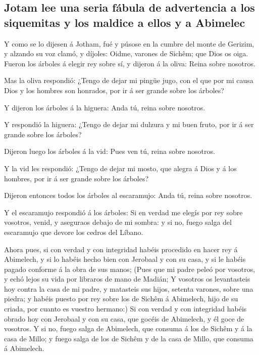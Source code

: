\hypertarget{jotam-lee-una-seria-fuxe1bula-de-advertencia-a-los-siquemitas-y-los-maldice-a-ellos-y-a-abimelec}{%
\subsection{Jotam lee una seria fábula de advertencia a los siquemitas y
los maldice a ellos y a
Abimelec}\label{jotam-lee-una-seria-fuxe1bula-de-advertencia-a-los-siquemitas-y-los-maldice-a-ellos-y-a-abimelec}}

 Y como se lo dijesen á Jotham, fué y púsose en la cumbre
del monte de Gerizim, y alzando su voz clamó, y díjoles: Oidme, varones
de Sichêm; que Dios os oiga.  Fueron los árboles á elegir
rey sobre sí, y dijeron á la oliva: Reina sobre nosotros.

 Mas la oliva respondió: ¿Tengo de dejar mi pingüe jugo, con
el que por mi causa Dios y los hombres son honrados, por ir á ser grande
sobre los árboles?

 Y dijeron los árboles á la higuera: Anda tú, reina sobre
nosotros.

 Y respondió la higuera: ¿Tengo de dejar mi dulzura y mi
buen fruto, por ir á ser grande sobre los árboles?

 Dijeron luego los árboles á la vid: Pues ven tú, reina
sobre nosotros.

 Y la vid les respondió: ¿Tengo de dejar mi mosto, que
alegra á Dios y á los hombres, por ir á ser grande sobre los árboles?

 Dijeron entonces todos los árboles al escaramujo: Anda tú,
reina sobre nosotros.

 Y el escaramujo respondió á los árboles: Si en verdad me
elegís por rey sobre vosotros, venid, y aseguraos debajo de mi sombra: y
si no, fuego salga del escaramujo que devore los cedros del Líbano.

 Ahora pues, si con verdad y con integridad habéis
procedido en hacer rey á Abimelech, y si lo habéis hecho bien con
Jerobaal y con su casa, y si le habéis pagado conforme á la obra de sus
manos;  (Pues que mi padre peleó por vosotros, y echó lejos
su vida por libraros de mano de Madián;  Y vosotros os
levantasteis hoy contra la casa de mi padre, y matasteis sus hijos,
setenta varones, sobre una piedra; y habéis puesto por rey sobre los de
Sichêm á Abimelech, hijo de su criada, por cuanto es vuestro hermano:)
 Si con verdad y con integridad habéis obrado hoy con
Jerobaal y con su casa, que gocéis de Abimelech, y él goce de vosotros.
 Y si no, fuego salga de Abimelech, que consuma á los de
Sichêm y á la casa de Millo; y fuego salga de los de Sichêm y de la casa
de Millo, que consuma á Abimelech.

